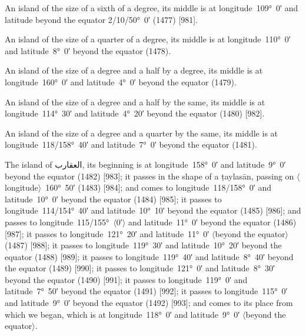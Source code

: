 \documentclass[11pt]{article}
\newcommand{\Pg}[1]{\marginpar{\footnotesize #1}}
\newcommand{\Ang}[1]{\ensuremath{#1}}
\begin{document}
An island of the size of a sixth of a degree, its middle is at longitude~109°~0′ and latitude beyond the equator 2/10/50°~0′ (1477) [981].

An island of the size of a quarter of a degree, its middle is at longitude~110°~0′ and latitude~8°~0′ beyond the equator (1478).

An island of the size of a degree and a half by a degree, its middle is at longitude~160°~0′ and latitude~4°~0′ beyond the equator (1479).

An island of the size of a degree and a half by the same, its middle is at longitude~114°~30′ and latitude~4°~20′ beyond the equator (1480) [982].

An island of the size of a degree and a quarter by the same, its middle is at longitude~118/158°~40′ and latitude~7°~0′ beyond the equator (1481).

The island of \textarabic{العقارب}, its beginning is at longitude~158°~0′ and latitude~9°~0′ beyond the equator (1482) [983]\Pg{p. 97}; it passes in the shape of a ṭaylasān, passing on \Ang{\langle}longitude\Ang{\rangle}~160°~50′ (1483) [984]; and comes to longitude~118/158°~0′ and latitude~10°~0′ beyond the equator (1484) [985]; it passes to longitude~114/154°~40′ and latitude~10°~10′ beyond the equator (1485) [986]; and passes to longitude~115/155°~\Ang{\langle}0′\Ang{\rangle} and latitude~11°~0′ beyond the equator (1486) [987]; it passes to longitude~121°~20′ and latitude~11°~0′ \Ang{\langle}beyond the equator\Ang{\rangle} (1487) [988]; it passes to longitude~119°~30′ and latitude~10°~20′ beyond the equator (1488) [989]; it passes to longitude~119°~40′ and latitude~8°~40′ beyond the equator (1489) [990]; it passes to longitude~121°~0′ and latitude~8°~30′ beyond the equator (1490) [991]; it passes to longitude~119°~0′ and latitude~7°~50′ beyond the equator (1491) [992]; it passes to longitude~115°~0′ and latitude~9°~0′ beyond the equator (1492) [993]; and comes to its place from which we began, which is at longitude~118°~0′ and latitude~9°~0′ \Ang{\langle}beyond the equator\Ang{\rangle}.
\end{document}
